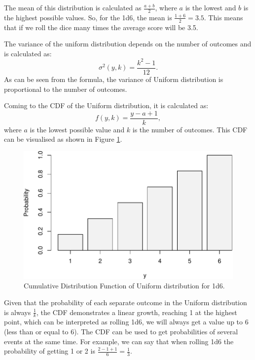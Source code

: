 \documentclass[
]{book}
\theoremstyle{definition}
\theoremstyle{definition}
\theoremstyle{definition}
\theoremstyle{definition}
\theoremstyle{remark}
\begin{document}
The mean of this distribution is calculated as \(\frac{a+b}{2}\), where \(a\) is the lowest and \(b\) is the highest possible values. So, for the 1d6, the mean is \(\frac{1+6}{2}=3.5\). This means that if we roll the dice many times the average score will be 3.5.

The variance of the uniform distribution depends on the number of outcomes and is calculated as:
\begin{equation}
    \sigma^2(y, k) = \frac{k^2-1}{12} .
    \label{eq:UniformVariance}
\end{equation}
As can be seen from the formula, the variance of Uniform distribution is proportional to the number of outcomes.

Coming to the CDF of the Uniform distribution, it is calculated as:
\begin{equation}
    f(y, k) = \frac{y-a+1}{k},
    \label{eq:UniformCDF}
\end{equation}
where \(a\) is the lowest possible value and \(k\) is the number of outcomes. This CDF can be visualised as shown in Figure \ref{fig:uniformCDF}.

\begin{figure}
\centering
\includegraphics{Svetunkov---Statistics-for-Business-Analytics_files/figure-latex/uniformCDF-1.pdf}
\caption{\label{fig:uniformCDF}Cumulative Distribution Function of Uniform distribution for 1d6.}
\end{figure}

Given that the probability of each separate outcome in the Uniform distribution is always \(\frac{1}{k}\), the CDF demonstrates a linear growth, reaching 1 at the highest point, which can be interpreted as rolling 1d6, we will always get a value up to 6 (less than or equal to 6). The CDF can be used to get probabilities of several events at the same time. For example, we can say that when rolling 1d6 the probability of getting 1 or 2 is \(\frac{2-1+1}{6}=\frac{1}{3}\).
\end{document}
